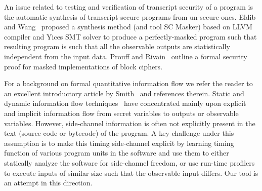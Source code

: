 An issue related to testing and verification of transcript security of
a program is the automatic synthesis of transcript-secure programs
from un-secure ones. Eldib and Wang~\cite{EW14} proposed a synthesis
method (and tool SC Masker) based on LLVM compiler and Yices SMT
solver to produce a perfectly-masked 
program such that resulting program is such that all the observable outputs are
statistically independent from the input data. 
Prouff and Rivain~\cite{PR13} outline a formal security proof for masked
implementations of block ciphers.      

For a background on formal quantitative information flow we refer the reader to
an excellent introductory article by Smith~\cite{smith09} and references therein.
Static and dynamic information flow techniques~\cite{SR10,Den76} have concentrated
mainly upon explicit and implicit information flow from secret variables to
outputs or observable variables.
However, side-channel information is often not explicitly present in the text
(source code or bytecode) of the program.
A key challenge under this assumption is to make this timing side-channel
explicit by learning timing function of various program units in the software
and use them to either statically analyze the software for side-channel freedom,
or use run-time profilers to execute inputs of similar size such that the
observable input differs.
Our tool is an attempt in this direction.




